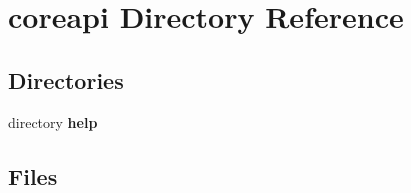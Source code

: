 \section{coreapi Directory Reference}
\label{dir_8405297cf9ea265a4522073385c50985}
\subsection*{Directories}
\begin{DoxyCompactItemize}
\item 
directory {\bf help}
\end{DoxyCompactItemize}
\subsection*{Files}
